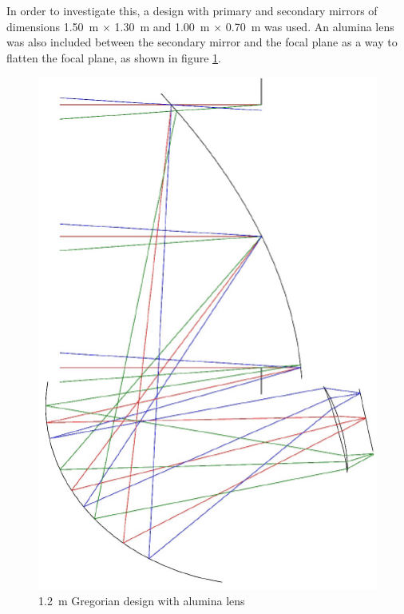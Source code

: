 \documentclass[11pt,a4paper]{article}
\begin{document}
In order to investigate this, a design with primary and secondary mirrors of dimensions 1.50~m $\times$ 1.30~m and 1.00~m $\times$ 0.70~m was used. An alumina lens was also included between the secondary mirror and the focal plane as a way to flatten the focal plane, as shown in figure \ref{fig:gregschem_lens}. 
\begin{figure}[htbp]
	\centering
	\includegraphics[scale=0.5]{core_greg_lens.png}
	\caption{1.2~m Gregorian design with alumina lens}
	\label{fig:gregschem_lens}
\end{figure}
\end{document}
